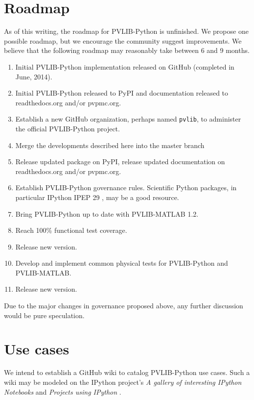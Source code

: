\documentclass[conference]{IEEEtran}
\begin{document}
\section{Roadmap}

As of this writing, the roadmap for PVLIB-Python is unfinished. 
We propose one possible roadmap, but we encourage the community suggest improvements. 
We believe that the following roadmap may reasonably take between 6 and 9 months. 

\begin{enumerate}
\item Initial PVLIB-Python implementation released on GitHub (completed in June, 2014).
\item Initial PVLIB-Python released to PyPI and documentation released to readthedocs.org and/or pvpmc.org.
\item Establish a new GitHub organization, perhaps named \texttt{pvlib}, to administer the official PVLIB-Python project.
\item Merge the developments described here into the master branch
\item Release updated package on PyPI, release updated documentation on readthedocs.org and/or pvpmc.org.
\item Establish PVLIB-Python governance rules. Scientific Python packages, in particular IPython IPEP 29 \cite{ipython-gov}, may be a good resource.
\item Bring PVLIB-Python up to date with PVLIB-MATLAB 1.2.
\item Reach 100\% functional test coverage.
\item Release new version.
\item Develop and implement common physical tests for PVLIB-Python and PVLIB-MATLAB.
\item Release new version.
\end{enumerate}

Due to the major changes in governance proposed above, any further discussion would be pure speculation.



\section{Use cases}

We intend to establish a GitHub wiki to catalog PVLIB-Python use cases. Such a wiki may be modeled on the IPython project's \emph{A gallery of interesting IPython Notebooks} and \emph{Projects using IPython} \cite{ipython-wiki}. 
\end{document}
